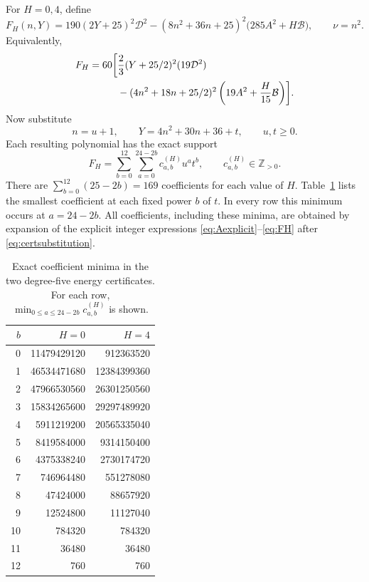 \documentclass[11pt]{article}
\theoremstyle{remark}
\numberwithin{equation}{section}
\newcommand{\Z}{\mathbb Z}
\newcommand{\cD}{\mathcal D}
\newcommand{\cB}{\mathcal B}
\begin{document}
For $H=0,4$, define
\begin{equation}
 F_H(n,Y)=190(2Y+25)^2\cD^2
 -(8n^2+36n+25)^2\bigl(285A^2+H\cB\bigr),
 \qquad \nu=n^2.
 \label{eq:FH}
\end{equation}
Equivalently,
\begin{align}
 F_H=60\biggl[&\frac23(Y+25/2)^2(19\cD^2)\notag\\
 &-(4n^2+18n+25/2)^2
       \left(19A^2+\frac H{15}\cB\right)\biggr].
 \label{eq:FHequiv}
\end{align}
Now substitute
\begin{equation}
 n=u+1,\qquad Y=4n^2+30n+36+t,
 \qquad u,t\ge0.
 \label{eq:certsubstitution}
\end{equation}
Each resulting polynomial has the exact support
\begin{equation}
 F_H=\sum_{b=0}^{12}\sum_{a=0}^{24-2b}c^{(H)}_{a,b}u^at^b,
 \qquad c^{(H)}_{a,b}\in\Z_{>0}.
 \label{eq:certificatepositive}
\end{equation}
There are $\sum_{b=0}^{12}(25-2b)=169$ coefficients for each value of
$H$. Table~\ref{tab:coefficients} lists the smallest coefficient at each
fixed power $b$ of $t$. In every row this minimum occurs at $a=24-2b$.
All coefficients, including these minima, are obtained by expansion of the
explicit integer expressions \eqref{eq:Aexplicit}--\eqref{eq:FH} after
\eqref{eq:certsubstitution}.

\begin{table}[htbp]
\centering
\caption{Exact coefficient minima in the two degree-five energy certificates.
For each row, $\min_{0\le a\le24-2b}c^{(H)}_{a,b}$ is shown.}
\label{tab:coefficients}
\renewcommand{\arraystretch}{1.12}
\begin{tabular}{@{}rrr@{}}
\toprule
$b$ & $H=0$ & $H=4$\\
\midrule
0 & 11479429120 & 912363520\\
1 & 46534471680 & 12384399360\\
2 & 47966530560 & 26301250560\\
3 & 15834265600 & 29297489920\\
4 & 5911219200 & 20565335040\\
5 & 8419584000 & 9314150400\\
6 & 4375338240 & 2730174720\\
7 & 746964480 & 551278080\\
8 & 47424000 & 88657920\\
9 & 12524800 & 11127040\\
10 & 784320 & 784320\\
11 & 36480 & 36480\\
12 & 760 & 760\\
\bottomrule
\end{tabular}
\end{table}
\end{document}
